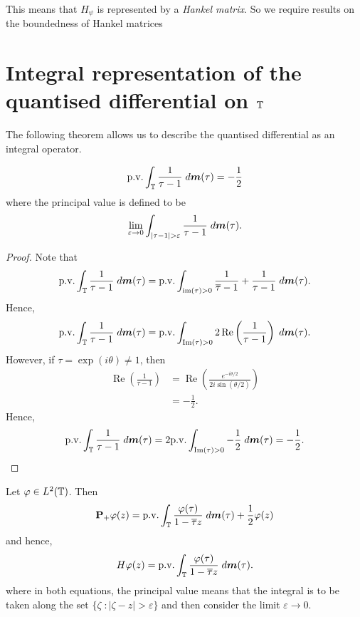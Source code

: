 This means that $H_\psi$ is represented by a \emph{Hankel matrix}. So we require
results on the boundedness of Hankel matrices

\section{Integral representation of the quantised differential on $\mathbb{T}$}
The following theorem allows us to describe the quantised differential as an integral operator.
\begin{lemma}
\label{singularIntegral}
    \begin{equation*}
        \mathrm{p.v.}\int_{\mathbb{T}} \frac{1}{\tau-1}\;d\boldsymbol{m}(\tau) = -\frac{1}{2}
    \end{equation*}
    where the principal value is defined to be
    \begin{equation*}
        \lim_{\varepsilon\rightarrow 0} \int_{|\tau-1|>\varepsilon} \frac{1}{\tau-1}\;d\ha(\tau).
    \end{equation*}
\end{lemma} 
\begin{proof}
    Note that
    \begin{equation*}
        \mathrm{p.v.}\int_{\mathbb{T}} \frac{1}{\tau-1}\;d\boldsymbol{m}(\tau) = \mathrm{p.v.}\int_{\operatorname{im}(\tau) > 0} \frac{1}{\overline{\tau}-1}+\frac{1}{\tau-1}\;d\boldsymbol{m}(\tau).
    \end{equation*}
    Hence,
    \begin{equation*}
        \mathrm{p.v.}\int_{\mathbb{T}} \frac{1}{\tau-1}\;d\boldsymbol{m}(\tau) = \mathrm{p.v.}\int_{\operatorname{Im}(\tau)>0} 2\operatorname{Re}\left(\frac{1}{\tau-1}\right)\;d\boldsymbol{m}(\tau).
    \end{equation*}
    However, if $\tau = \exp(i\theta) \neq 1$, then
    \begin{align*}
        \operatorname{Re}\left(\frac{1}{\tau-1}\right) &= \operatorname{Re}\left(\frac{e^{-i\theta/2}}{2i\sin(\theta/2)}\right)\\
        &= -\frac{1}{2}.
    \end{align*}
    Hence,
    \begin{equation*}
        \mathrm{p.v.}\int_{\mathbb{T}} \frac{1}{\tau-1}\;d\boldsymbol{m}(\tau) = 2\mathrm{p.v.}\int_{\operatorname{Im}(\tau)>0} -\frac{1}{2}\;d\boldsymbol{m}(\tau) = -\frac{1}{2}.
    \end{equation*}
\end{proof}
\begin{theorem}
    Let $\varphi \in L^2(\mathbb{T})$. Then
    \begin{equation*}
        \mathbf{P}_+\varphi(z) = \mathrm{p.v.}\int_{\mathbb{T}} \frac{\varphi(\tau)}{1-\overline{\tau}z}\;d\boldsymbol{m}(\tau)+\frac{1}{2}\varphi(z)
    \end{equation*}
    and hence,
    \begin{equation*}
        H\varphi(z) = \mathrm{p.v.}\int_{\mathbb{T}} \frac{\varphi(\tau)}{1-\overline{\tau}z}\;d\boldsymbol{m}(\tau).
    \end{equation*}
    where in both equations, the principal value means that the integral is to be taken along the set $\{ \zeta\;:|\zeta-z| > \varepsilon\}$
    and then consider the limit $\varepsilon\rightarrow 0$.
\end{theorem}
